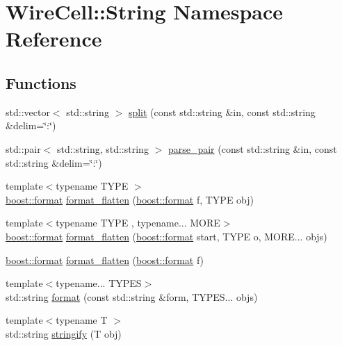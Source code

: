 \hypertarget{namespace_wire_cell_1_1_string}{}\section{Wire\+Cell\+:\+:String Namespace Reference}
\label{namespace_wire_cell_1_1_string}
\subsection*{Functions}
\begin{DoxyCompactItemize}
\item 
std\+::vector$<$ std\+::string $>$ \hyperlink{namespace_wire_cell_1_1_string_aef23d7b89dbe21e34a499c9156dd1e60}{split} (const std\+::string \&in, const std\+::string \&delim=\char`\"{}\+:\char`\"{})
\item 
std\+::pair$<$ std\+::string, std\+::string $>$ \hyperlink{namespace_wire_cell_1_1_string_aa275a51c718c16893c21d2a915cab1e6}{parse\+\_\+pair} (const std\+::string \&in, const std\+::string \&delim=\char`\"{}\+:\char`\"{})
\item 
{\footnotesize template$<$typename T\+Y\+PE $>$ }\\\hyperlink{locale_8h_a4d9ddd9260f49d99308d41580d169bd2}{boost\+::format} \hyperlink{namespace_wire_cell_1_1_string_a483dc976ea784d91bef184a893e9bba8}{format\+\_\+flatten} (\hyperlink{locale_8h_a4d9ddd9260f49d99308d41580d169bd2}{boost\+::format} f, T\+Y\+PE obj)
\item 
{\footnotesize template$<$typename T\+Y\+PE , typename... M\+O\+RE$>$ }\\\hyperlink{locale_8h_a4d9ddd9260f49d99308d41580d169bd2}{boost\+::format} \hyperlink{namespace_wire_cell_1_1_string_acaae0ff0fab063552147e1e59cec4e00}{format\+\_\+flatten} (\hyperlink{locale_8h_a4d9ddd9260f49d99308d41580d169bd2}{boost\+::format} start, T\+Y\+PE o, M\+O\+R\+E... objs)
\item 
\hyperlink{locale_8h_a4d9ddd9260f49d99308d41580d169bd2}{boost\+::format} \hyperlink{namespace_wire_cell_1_1_string_ad79965a560a4a4f94405ebee6d2ee256}{format\+\_\+flatten} (\hyperlink{locale_8h_a4d9ddd9260f49d99308d41580d169bd2}{boost\+::format} f)
\item 
{\footnotesize template$<$typename... T\+Y\+P\+ES$>$ }\\std\+::string \hyperlink{namespace_wire_cell_1_1_string_ade706f4cfc3f6e8a946d95f1b06dbb56}{format} (const std\+::string \&form, T\+Y\+P\+E\+S... objs)
\item 
{\footnotesize template$<$typename T $>$ }\\std\+::string \hyperlink{namespace_wire_cell_1_1_string_a7aac9b5f4bf607e959ff98125287ab2a}{stringify} (T obj)
\end{DoxyCompactItemize}


